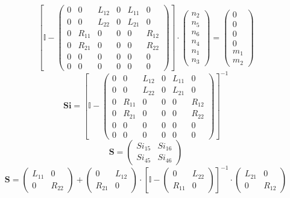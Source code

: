 \[ \left[ \mathbb{I}  - \left(\begin{smallmatrix} 0 & 0 & L_{12} & 0 & L_{11} & 0 \\ 0 & 0 & L_{22} & 0 & L_{21} & 0 \\ 0 & R_{11} & 0 & 0 & 0 & R_{12} \\ 0 & R_{21} & 0 & 0 & 0 & R_{22} \\ 0 & 0 & 0 & 0 & 0 & 0 \\ 0 & 0 & 0 & 0 & 0 & 0 \end{smallmatrix}\right)\right] \cdot \left(\begin{smallmatrix} n_{2} \\ n_{5} \\ n_{6} \\ n_{4} \\ n_{1} \\ n_{3} \end{smallmatrix}\right) = \left(\begin{smallmatrix} 0 \\ 0 \\ 0 \\ 0 \\ m_{1} \\ m_{2} \end{smallmatrix}\right) \]
\[ \mathbf{Si} = \left[ \mathbb{I}  - \left(\begin{smallmatrix} 0 & 0 & L_{12} & 0 & L_{11} & 0 \\ 0 & 0 & L_{22} & 0 & L_{21} & 0 \\ 0 & R_{11} & 0 & 0 & 0 & R_{12} \\ 0 & R_{21} & 0 & 0 & 0 & R_{22} \\ 0 & 0 & 0 & 0 & 0 & 0 \\ 0 & 0 & 0 & 0 & 0 & 0 \end{smallmatrix}\right) \right]^{-1} \]
\[ \mathbf{S} = \left(\begin{smallmatrix} Si_{15} & Si_{16} \\ Si_{45} & Si_{46} \end{smallmatrix}\right) \]
\[ \mathbf{S} = \left(\begin{smallmatrix} L_{11} & 0 \\ 0 & R_{22} \end{smallmatrix}\right) + \left(\begin{smallmatrix} 0 & L_{12} \\ R_{21} & 0 \end{smallmatrix}\right) \cdot \left[ \mathbb{I}  - \left(\begin{smallmatrix} 0 & L_{22} \\ R_{11} & 0 \end{smallmatrix}\right) \right]^{-1} \cdot\left(\begin{smallmatrix} L_{21} & 0 \\ 0 & R_{12} \end{smallmatrix}\right) \]
